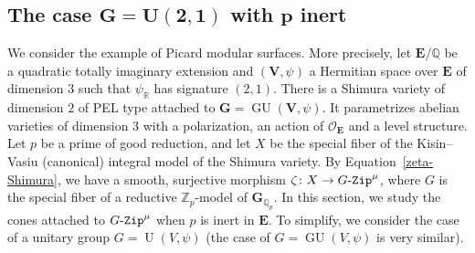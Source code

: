 \documentclass[11pt]{amsart}
\numberwithin{equation}{section}
\theoremstyle{definition}
\theoremstyle{remark}
\newcommand{\GZip}{\mathop{\text{$G$-{\tt Zip}}}\nolimits}
\newcommand{\Ocal}{{\mathcal O}}
\newcommand{\QQ}{\mathbb{Q}}
\newcommand{\RR}{\mathbb{R}}
\newcommand{\ZZ}{\mathbb{Z}}
\DeclareMathOperator{\U}{U}
\DeclareMathOperator{\GU}{GU}
\begin{document}
\subsection{The case $\boldsymbol{G=U(2,1)}$ with $\boldsymbol{p}$ inert}
We consider the example of Picard modular surfaces. More precisely, let $\mathbf{E}/\QQ$ be a quadratic totally imaginary extension and $(\mathbf{V},\psi)$ a Hermitian space over $\mathbf{E}$ of dimension $3$ such that $\psi_\RR$ has signature $(2,1)$. There is a Shimura variety of dimension $2$ of PEL type attached to $\mathbf{G}=\GU(\mathbf{V},\psi)$. It parametrizes abelian varieties of dimension $3$ with a polarization, an action of $\Ocal_{\mathbf{E}}$ and a level structure. Let $p$ be a prime of good reduction, and let $X$ be the special fiber of the Kisin--Vasiu (canonical) integral model of the Shimura variety. By Equation~\eqref{zeta-Shimura}, we have a smooth, surjective morphism $\zeta \colon X\to \GZip^\mu$, where $G$ is the special fiber of a reductive $\ZZ_p$-model of $\mathbf{G}_{\QQ_p}$. In this section, we study the cones attached to $\GZip^\mu$ when $p$ is inert in $\mathbf{E}$. To simplify, we consider the case of a unitary group $G=\U(V,\psi)$ (the case of $G=\GU(V,\psi)$ is very similar).
\end{document}
